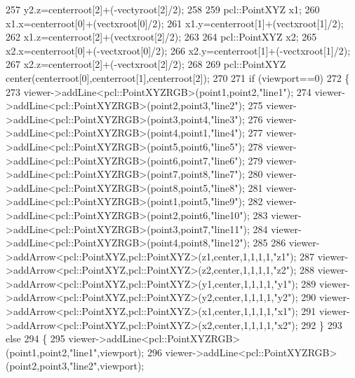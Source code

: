 \begin{DoxyCode}
257     y2.z=centerroot[2]+(-vectyroot[2]/2);
258     
259     pcl::PointXYZ x1;
260     x1.x=centerroot[0]+(vectxroot[0]/2);
261     x1.y=centerroot[1]+(vectxroot[1]/2);
262     x1.z=centerroot[2]+(vectxroot[2]/2);
263 
264     pcl::PointXYZ x2;
265     x2.x=centerroot[0]+(-vectxroot[0]/2);
266     x2.y=centerroot[1]+(-vectxroot[1]/2);
267     x2.z=centerroot[2]+(-vectxroot[2]/2);
268 
269     pcl::PointXYZ center(centerroot[0],centerroot[1],centerroot[2]);
270 
271     \textcolor{keywordflow}{if} (viewport==0)
272     \{
273         viewer->addLine<pcl::PointXYZRGB>(point1,point2,\textcolor{stringliteral}{"line1"});
274         viewer->addLine<pcl::PointXYZRGB>(point2,point3,\textcolor{stringliteral}{"line2"});
275         viewer->addLine<pcl::PointXYZRGB>(point3,point4,\textcolor{stringliteral}{"line3"});
276         viewer->addLine<pcl::PointXYZRGB>(point4,point1,\textcolor{stringliteral}{"line4"});
277         viewer->addLine<pcl::PointXYZRGB>(point5,point6,\textcolor{stringliteral}{"line5"});
278         viewer->addLine<pcl::PointXYZRGB>(point6,point7,\textcolor{stringliteral}{"line6"});
279         viewer->addLine<pcl::PointXYZRGB>(point7,point8,\textcolor{stringliteral}{"line7"});
280         viewer->addLine<pcl::PointXYZRGB>(point8,point5,\textcolor{stringliteral}{"line8"});
281         viewer->addLine<pcl::PointXYZRGB>(point1,point5,\textcolor{stringliteral}{"line9"});
282         viewer->addLine<pcl::PointXYZRGB>(point2,point6,\textcolor{stringliteral}{"line10"});
283         viewer->addLine<pcl::PointXYZRGB>(point3,point7,\textcolor{stringliteral}{"line11"});
284         viewer->addLine<pcl::PointXYZRGB>(point4,point8,\textcolor{stringliteral}{"line12"});
285 
286         viewer->addArrow<pcl::PointXYZ,pcl::PointXYZ>(z1,center,1,1,1,1,\textcolor{stringliteral}{"z1"});
287         viewer->addArrow<pcl::PointXYZ,pcl::PointXYZ>(z2,center,1,1,1,1,\textcolor{stringliteral}{"z2"});
288         viewer->addArrow<pcl::PointXYZ,pcl::PointXYZ>(y1,center,1,1,1,1,\textcolor{stringliteral}{"y1"});
289         viewer->addArrow<pcl::PointXYZ,pcl::PointXYZ>(y2,center,1,1,1,1,\textcolor{stringliteral}{"y2"});
290         viewer->addArrow<pcl::PointXYZ,pcl::PointXYZ>(x1,center,1,1,1,1,\textcolor{stringliteral}{"x1"});
291         viewer->addArrow<pcl::PointXYZ,pcl::PointXYZ>(x2,center,1,1,1,1,\textcolor{stringliteral}{"x2"});
292     \}
293     \textcolor{keywordflow}{else}
294     \{
295         viewer->addLine<pcl::PointXYZRGB>(point1,point2,\textcolor{stringliteral}{"line1"},viewport);
296         viewer->addLine<pcl::PointXYZRGB>(point2,point3,\textcolor{stringliteral}{"line2"},viewport);

\end{DoxyCode}
